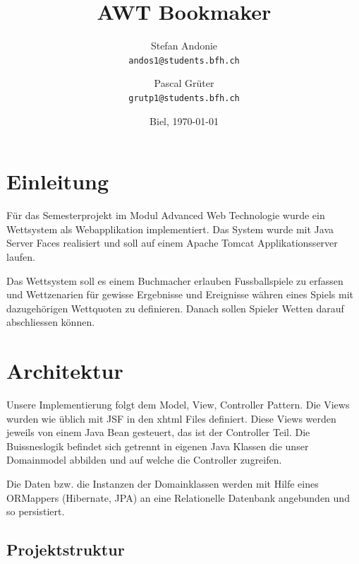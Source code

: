 \documentclass[a4paper, abstracton]{scrartcl}
\begin{document}
\title{\vspace{1cm}AWT Bookmaker \vspace{1cm}}
\author{
  Stefan Andonie\\
  \texttt{andos1@students.bfh.ch}
  \and
  Pascal Grüter\\
  \texttt{grutp1@students.bfh.ch}\vspace{1cm}
}

\date{Biel, \today}
\vspace{3cm}
\maketitle
\thispagestyle{titlepage}


\pagebreak
\tableofcontents	%
\pagebreak

\section{Einleitung}

  Für das Semesterprojekt im Modul Advanced Web Technologie wurde ein Wettsystem
  als Webapplikation implementiert.
  Das System wurde mit Java Server Faces realisiert und soll auf einem Apache
  Tomcat Applikationsserver laufen.
  
  Das Wettsystem soll es einem Buchmacher erlauben Fussballspiele zu erfassen
  und Wettzenarien für gewisse Ergebnisse und Ereignisse währen eines Spiels mit
  dazugehörigen Wettquoten zu definieren.
  Danach sollen Spieler Wetten darauf abschliessen können.

\section{Architektur}

  Unsere Implementierung folgt dem Model, View, Controller Pattern.
  Die Views wurden wie üblich mit JSF in den xhtml Files definiert.
  Diese Views werden jeweils von einem Java Bean gesteuert, das ist der
  Controller Teil. Die Buissneslogik befindet sich getrennt in eigenen Java
  Klassen die unser Domainmodel abbilden und auf welche die Controller zugreifen.
  
  Die Daten bzw. die Instanzen der Domainklassen werden mit Hilfe eines ORMappers
  (Hibernate, JPA) an eine Relationelle Datenbank angebunden und so persistiert.

  \subsection{Projektstruktur}
\end{document}
